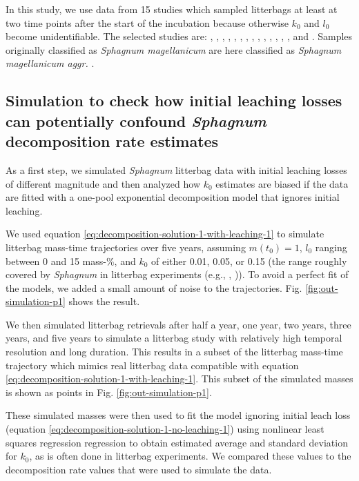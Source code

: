 \documentclass[bg, manuscript]{copernicus}
\begin{document}
In this study, we use data from 15 studies which sampled litterbags at least at two time points after the start of the incubation because otherwise \(k_0\) and \(l_0\) become unidentifiable. The selected studies are: \citet{Bartsch.1985}, \citet{Vitt.1990}, \citet{Johnson.1991}, \citet{Szumigalski.1996}, \citet{Prevost.1997}, \citet{Scheffer.2001}, \citet{Thormann.2001}, \citet{Asada.2005b}, \citet{Trinder.2008}, \citet{Breeuwer.2008}, \citet{Strakova.2010}, \citet{Hagemann.2015}, \citet{Bengtsson.2017}, \citet{Golovatskaya.2017}, and \citet{Makila.2018}. Samples originally classified as \emph{Sphagnum magellanicum} are here classified as \emph{Sphagnum magellanicum aggr.} \citep{Hassel.2018}.

\subsection{\texorpdfstring{Simulation to check how initial leaching losses can potentially confound \emph{Sphagnum} decomposition rate estimates}{Simulation to check how initial leaching losses can potentially confound Sphagnum decomposition rate estimates}}

As a first step, we simulated \emph{Sphagnum} litterbag data with initial leaching losses of different magnitude and then analyzed how \(k_0\) estimates are biased if the data are fitted with a one-pool exponential decomposition model that ignores initial leaching.

We used equation \eqref{eq:decomposition-solution-1-with-leaching-1} to simulate litterbag mass-time trajectories over five years, assuming \(m(t_0)=1\), \(l_0\) ranging between 0 and 15 mass-\%, and \(k_0\) of either 0.01, 0.05, or 0.15 (the range roughly covered by \emph{Sphagnum} in litterbag experiments (e.g., \citet{Moore.2007}, \citet{Turetsky.2008})). To avoid a perfect fit of the models, we added a small amount of noise to the trajectories. Fig. \ref{fig:out-simulation-p1} shows the result.

We then simulated litterbag retrievals after half a year, one year, two years, three years, and five years to simulate a litterbag study with relatively high temporal resolution and long duration. This results in a subset of the litterbag mass-time trajectory which mimics real litterbag data compatible with equation \eqref{eq:decomposition-solution-1-with-leaching-1}. This subset of the simulated masses is shown as points in Fig. \ref{fig:out-simulation-p1}.

These simulated masses were then used to fit the model ignoring initial leach loss (equation \eqref{eq:decomposition-solution-1-no-leaching-1}) using nonlinear least squares regression regression to obtain estimated average and standard deviation for \(k_0\), as is often done in litterbag experiments. We compared these values to the decomposition rate values that were used to simulate the data.
\end{document}
